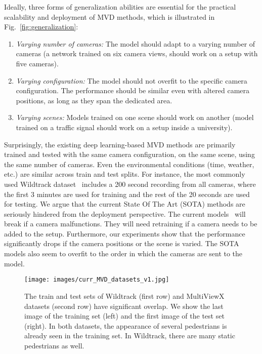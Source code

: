 \documentclass[letterpaper, 10 pt, conference]{ieeeconf}  \usepackage{times}
\begin{document}
 Ideally, three forms of generalization abilities are essential for the practical scalability and deployment of MVD methods, which is illustrated in Fig.~\ref{fig:generalization}:
\begin{enumerate}
    \item \emph{Varying number of cameras:} The model should adapt to a varying number of cameras (a network trained on six camera views, should work on a setup with five cameras). 
    \item \emph{Varying configuration:} The model should not overfit to the specific camera configuration. The performance should be similar even with altered camera positions, as long as they span the dedicated area. 
    \item \emph{Varying scenes:} Models trained on one scene should work on another (model trained on a traffic signal should work on a setup inside a university). 
\end{enumerate}
Surprisingly, the existing deep learning-based MVD methods are primarily trained and tested with the same camera configuration, on the same scene, using the same number of cameras. Even the environmental conditions (time, weather, etc.) are similar across train and test splits. For instance, the most commonly used Wildtrack dataset~\cite{Chavdarova2018WILDTRACKAM} includes a 200 second recording from all cameras, where the first 3 minutes are used for training and the rest of the 20 seconds are used for testing. We argue that the current State Of The Art (SOTA) methods are seriously hindered from the deployment perspective. The current models~\cite{hou2020multiview,hou2021multiview,song2021stacked} will break if a camera malfunctions. They will need retraining if a camera needs to be added to the setup. Furthermore, our experiments show that the performance significantly drops if the camera positions or the scene is varied. The SOTA models also seem to overfit to the order in which the cameras are sent to the model. 


 \begin{figure}
    \centering
    \texttt{[image: images/curr\_MVD\_datasets\_v1.jpg]}
    \caption{The train and test sets of Wildtrack (first row) and MultiViewX datasets (second row) have significant overlap. We show the last image of the training set (left) and the first image of the test set (right). In both datasets, the appearance of several pedestrians is already seen in the training set. In Wildtrack, there are many static pedestrians as well.}
    \label{fig:dataset_issues}
\end{figure}
\end{document}
